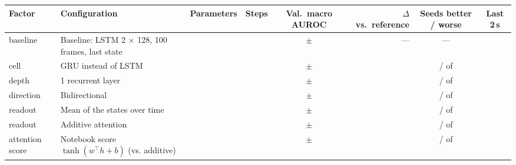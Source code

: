 \begin{tabular}{llrrcrcc}
\toprule
Factor & Configuration & Parameters & Steps & Val.\ macro AUROC & $\Delta$ vs.\ reference & Seeds better / worse & Last 2\,s \\
\midrule
baseline & Baseline: LSTM 2 $\times$ 128, 100 frames, last state & \rnnParamsBase{} & \rnnStepsBase{} & \rnnValAurocMeanBase{} $\pm$ \rnnValAurocSdBase{} & --- & --- & \rnnSensLastBase{} \\
\addlinespace
cell & GRU instead of LSTM & \rnnParamsGru{} & \rnnStepsGru{} & \rnnValAurocMeanGru{} $\pm$ \rnnValAurocSdGru{} & \rnnDiffMeanGru{} & \rnnNSeedsBetterGru{} / \rnnNSeedsWorseGru{} of \rnnNSeedsComparedGru{} & \rnnSensLastGru{} \\
\addlinespace
depth & 1 recurrent layer & \rnnParamsLayersOne{} & \rnnStepsLayersOne{} & \rnnValAurocMeanLayersOne{} $\pm$ \rnnValAurocSdLayersOne{} & \rnnDiffMeanLayersOne{} & \rnnNSeedsBetterLayersOne{} / \rnnNSeedsWorseLayersOne{} of \rnnNSeedsComparedLayersOne{} & \rnnSensLastLayersOne{} \\
\addlinespace
direction & Bidirectional & \rnnParamsBi{} & \rnnStepsBi{} & \rnnValAurocMeanBi{} $\pm$ \rnnValAurocSdBi{} & \rnnDiffMeanBi{} & \rnnNSeedsBetterBi{} / \rnnNSeedsWorseBi{} of \rnnNSeedsComparedBi{} & \rnnSensLastBi{} \\
\addlinespace
readout & Mean of the states over time & \rnnParamsMean{} & \rnnStepsMean{} & \rnnValAurocMeanMean{} $\pm$ \rnnValAurocSdMean{} & \rnnDiffMeanMean{} & \rnnNSeedsBetterMean{} / \rnnNSeedsWorseMean{} of \rnnNSeedsComparedMean{} & \rnnSensLastMean{} \\
readout & Additive attention & \rnnParamsAttn{} & \rnnStepsAttn{} & \rnnValAurocMeanAttn{} $\pm$ \rnnValAurocSdAttn{} & \rnnDiffMeanAttn{} & \rnnNSeedsBetterAttn{} / \rnnNSeedsWorseAttn{} of \rnnNSeedsComparedAttn{} & \rnnSensLastAttn{} \\
\addlinespace
attention score & Notebook score $\tanh(w^\top h+b)$ (vs. additive) & \rnnParamsAttnTanh{} & \rnnStepsAttnTanh{} & \rnnValAurocMeanAttnTanh{} $\pm$ \rnnValAurocSdAttnTanh{} & \rnnDiffMeanAttnTanh{} & \rnnNSeedsBetterAttnTanh{} / \rnnNSeedsWorseAttnTanh{} of \rnnNSeedsComparedAttnTanh{} & \rnnSensLastAttnTanh{} \\

\end{tabular}
